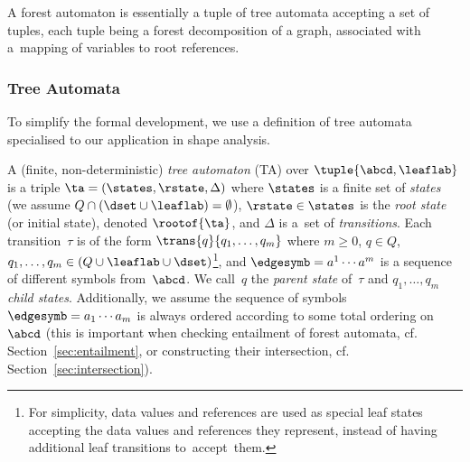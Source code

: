 A forest automaton is essentially a tuple of tree automata accepting a set of
tuples, each tuple being a forest decomposition of a graph, associated with a~mapping of variables to root references.

\subsubsection*{Tree Automata}
To simplify the formal development, we use a definition of tree automata specialised to our application in shape analysis.

A (finite, non-deterministic) \emph{tree automaton} (TA) over
$\tuple{\abcd,\leaflab}$
is a triple $\ta =
(\states, \rstate, \Delta)$ where $\states$ is a finite set of \emph{states}
(we assume $Q \cap (\dset \cup \leaflab) = \emptyset$),
$\rstate \in \states$ is the \emph{root state} (or initial state), denoted
$\rootof{\ta}$, and $\Delta$ is a~set of \emph{transitions}. Each
transition~$\tau$ is
of the form $\trans{q}{q_1, \dots, q_m}$ where $m \geq 0$, $q \in Q$,
$q_1,\ldots,q_m\in (Q \cup \leaflab \cup \dset)$\footnote{For
simplicity, data values and references are used as special leaf states accepting the
data values and references they represent, instead of having additional leaf
transitions to~accept~them.}, and $\edgesymb = a^1 \cdots a^m$ is a
sequence of different symbols from~$\abcd$.
We call~$q$ the \emph{parent state} of~$\tau$ and $q_1, \ldots, q_m$
\emph{child states}. 
%
Additionally, we assume the sequence of symbols  $\edgesymb = a_1 \cdots a_m$ is always ordered according to some total ordering on $\abcd$ (this is important when checking entailment of forest automata, cf. Section~\ref{sec:entailment}, or constructing their intersection, cf. Section~\ref{sec:intersection}).
%


